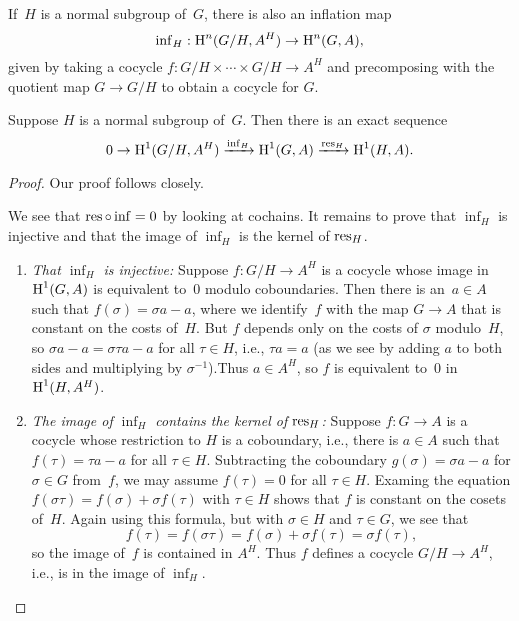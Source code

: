 If~$H$ is a normal subgroup of~$G$, there is also an inflation map
$$
\operatorname{inf}_H: \operatorname{H}^n(G/H, A^H) \to \operatorname{H}^n(G,A),
$$
given by taking a cocycle $f : G/H \times \cdots \times G/H \to A^H$
and precomposing with the quotient map $G\to G/H$ to obtain a cocycle for $G$.

\begin{proposition}\label{prop:infres}
Suppose $H$ is a normal subgroup of~$G$.
Then there is an exact sequence
$$
  0 \to \operatorname{H}^1(G/H, A^H)\xrightarrow{\operatorname{inf}_H}  \operatorname{H}^1(G,A)\xrightarrow{\operatorname{res}_H} \operatorname{H}^1(H,A).
$$
\end{proposition}
\begin{proof}
Our proof follows \cite[pg.~117]{serre:localfields} closely.

We see that $\operatorname{res}\circ \operatorname{inf} = 0$ by looking at cochains.  It remains
to prove that $\inf_H$ is injective and that the image of $\inf_H$
is the kernel of $\operatorname{res}_H$.
\begin{enumerate}

\item {\em That $\inf_H$ is injective:} Suppose $f:G/H\to A^H$ is a
  cocycle whose image in $\operatorname{H}^1(G,A)$ is equivalent to~$0$ modulo
  coboundaries.  Then there is an~$a\in A$ such that $f(\sigma) =
  \sigma a - a$, where we identify~$f$ with the map $G\to A$ that is
  constant on the costs of~$H$.  But $f$ depends only on the costs of
  $\sigma$ modulo~$H$, so $\sigma a - a = \sigma \tau a - a$ for all
  $\tau \in H$, i.e., $\tau a = a$ (as we see by adding $a$ to both
  sides and multiplying by $\sigma^{-1}$).Thus $a\in A^H$, so $f$ is
  equivalent to~$0$ in $\operatorname{H}^1(H,A^H)$.

\item {\em The image of $\inf_H$ contains the kernel of $\operatorname{res}_H$:}
Suppose $f:G\to A$ is a cocycle whose
restriction to $H$ is a coboundary, i.e., there is $a\in A$ such
that $f(\tau) = \tau a - a$ for all $\tau \in H$.
Subtracting the coboundary $g(\sigma) = \sigma a - a$ for $\sigma\in G$
from~$f$, we may assume $f(\tau) = 0$ for all $\tau \in H$.
Examing the equation $f(\sigma\tau) = f(\sigma) + \sigma f(\tau)$
with $\tau\in H$ shows that $f$ is constant on the cosets of~$H$.
Again using this formula, but with $\sigma\in H$ and $\tau\in G$, we see
that
$$
  f(\tau) = f(\sigma \tau) = f(\sigma) + \sigma f(\tau) = \sigma f(\tau),
$$
so the image of~$f$ is contained in $A^H$.  Thus $f$ defines a cocycle
$G/H \to A^H$, i.e., is in the image of $\inf_H$.
\end{enumerate}

\end{proof}

